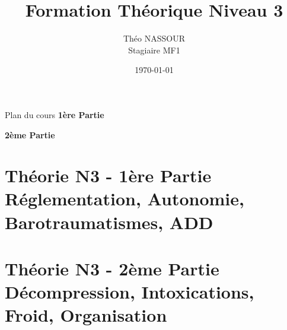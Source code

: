 \documentclass[aspectratio=169]{beamer}
\title[Formation Théorique N3]{Formation Théorique Niveau 3}
\author[Théo NASSOUR]{Théo NASSOUR\\\small Stagiaire MF1}
\institute[CST]{CST — Club Subaquatique Thiernois}
\date[]{\today}
\begin{document}


{
  \begin{frame}[allowframebreaks]{Plan du cours}
    \textbf{1ère Partie}
    \tableofcontents[part=1]
    
    \vspace{1em}

    \textbf{2ème Partie}
    \tableofcontents[part=2]
  \end{frame}
}


\part{Théorie N3 - 1ère Partie\\Réglementation, Autonomie, Barotraumatismes, ADD}







\part{Théorie N3 - 2ème Partie\\Décompression, Intoxications, Froid, Organisation}








\end{document}
